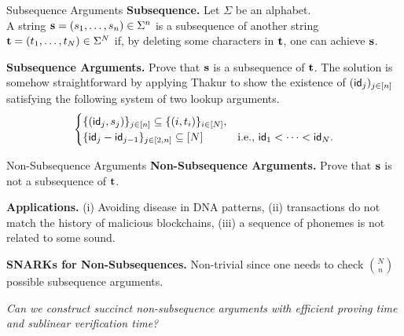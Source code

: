 \begin{frame}{Subsequence Arguments}
	\textbf{Subsequence.} Let $\Sigma$ be an alphabet. \\
	A string $\mathbf{s} = (s_1, \dots, s_n) \in \Sigma^n$ is a subsequence of another string $\mathbf{t} = (t_1, \dots, t_N) \in \Sigma^N$ if, by deleting some characters in $\mathbf{t}$, one can achieve $\mathbf{s}$.
	
	\textbf{Subsequence Arguments.} Prove that $\mathbf{s}$ is a subsequence of $\mathbf{t}$. The solution is somehow straightforward by applying Thakur \cite{EPRINT:Thakur23} to show the existence of $(\mathsf{id}_j)_{j \in [n]}$ satisfying the following system of two lookup arguments.
	\begin{equation*}
		\begin{cases}
			\{(\mathsf{id}_j, s_j)\}_{j \in [n]} \subseteq \{(i, t_i)\}_{i \in [N]},\\
			\{\mathsf{id}_j - \mathsf{id}_{j - 1}\}_{j \in [2, n]} \subseteq [N] &\text{i.e., $\mathsf{id}_1 < \dots < \mathsf{id}_N$}.
		\end{cases}
	\end{equation*}
\end{frame}

\begin{frame}{Non-Subsequence Arguments}
	\textbf{Non-Subsequence Arguments.} Prove that $\mathbf{s}$ is not a subsequence of $\mathbf{t}$.
	
	\textbf{Applications.} (i) Avoiding disease in DNA patterns, (ii) transactions do not match the history of malicious blockchains, (iii) a sequence of phonemes is not related to some sound.
	
	\textbf{SNARKs for Non-Subsequences.} Non-trivial since one needs to check $\binom{N}{n}$ possible subsequence arguments.
	
	\begin{center}
		\emph{Can we construct succinct non-subsequence arguments with efficient proving time and sublinear verification time?}
	\end{center}
\end{frame}